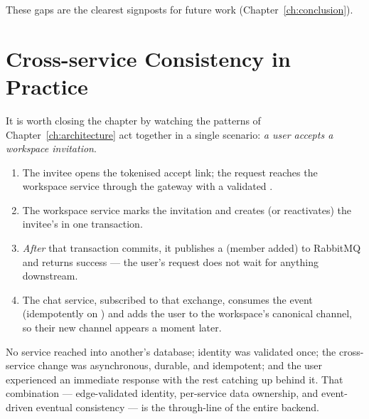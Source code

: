 These gaps are the clearest signposts for future work (Chapter~\ref{ch:conclusion}).

\section{Cross-service Consistency in Practice}

It is worth closing the chapter by watching the patterns of
Chapter~\ref{ch:architecture} act together in a single scenario:
\emph{a user accepts a workspace invitation}.

\begin{enumerate}
  \item The invitee opens the tokenised accept link; the request reaches the
  workspace service through the gateway with a validated .
  \item The workspace service marks the invitation  and creates
  (or reactivates) the invitee's  in one transaction.
  \item \emph{After} that transaction commits, it publishes a
   (member added) to RabbitMQ and returns success ---
  the user's request does not wait for anything downstream.
  \item The chat service, subscribed to that exchange, consumes the event
  (idempotently on ) and adds the user to the workspace's canonical
  channel, so their new channel appears a moment later.
\end{enumerate}

No service reached into another's database; identity was validated once; the
cross-service change was asynchronous, durable, and idempotent; and the user
experienced an immediate response with the rest catching up behind it. That
combination --- edge-validated identity, per-service data ownership, and
event-driven eventual consistency --- is the through-line of the entire backend.
